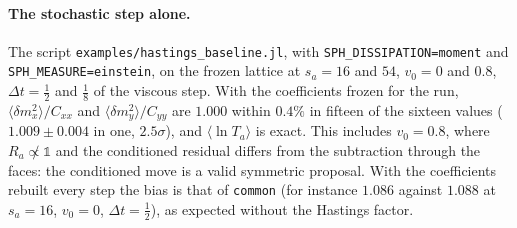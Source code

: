\documentclass[11pt,aps,preprint,nofootinbib,superscriptaddress,tightenlines]{revtex4-2}
\newcommand{\one}{\mathds{1}}
\let\oldparagraph\paragraph
\renewcommand{\paragraph}{\par\bigskip\oldparagraph}
\begin{document}
\paragraph{The stochastic step alone.}  The script \texttt{examples/hastings\_baseline.jl}, with \texttt{SPH\_DISSIPATION=moment} and
\texttt{SPH\_MEASURE=einstein}, on the frozen lattice at $s_a=16$ and $54$, $v_0=0$ and $0.8$, $\Delta t=\frac12$ and $\frac18$ of the viscous step.  With the coefficients frozen for the run, $\langle\delta m_x^2\rangle/C_{xx}$ and
$\langle\delta m_y^2\rangle/C_{yy}$ are $1.000$ within $0.4\%$ in fifteen of the sixteen values ($1.009\pm0.004$ in one, $2.5\sigma$), and
$\langle\ln T_a\rangle$ is exact.  This includes $v_0=0.8$, where
$R_a\not\propto\one$ and the conditioned residual differs from the subtraction through the faces: the conditioned move is a valid symmetric
proposal.  With the coefficients rebuilt every step the bias is that of \texttt{common} (for instance $1.086$ against $1.088$ at $s_a=16$, $v_0=0$,
$\Delta t=\frac12$), as expected without the Hastings factor.
\end{document}
